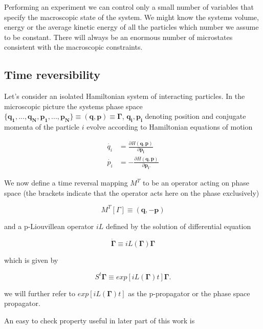 \documentclass[a4paper,12pt,nofootinbib]{article}
\begin{document}
Performing an experiment we can control only a small number of variables that specify the macroscopic state of the system. We might know the systems volume, energy or the average kinetic energy of all the particles which number we assume to be constant. There will always be an enormous number of microstates consistent with the macroscopic constraints.

\subsection{Time reversibility}
Let's consider an isolated Hamiltonian system of interacting particles.
In the microscopic picture the systems phase space $\{\bm{q_1},...,\bm{q_N},\bm{p_1},...,\bm{p_N} \} \equiv (\bm{q},\bm{p})\equiv \bm{\Gamma} $, $\bm{q_i}, \bm{p_i} $ denoting position and conjugate momenta of the particle $i$ evolve according to Hamiltonian equations of motion

\begin{equation}
\begin{aligned}
  \dot{q_i} &=\frac{\partial H(\bm{q},\bm{p})}{\partial{\bm{p_i}}} \\
  \dot{p_i} &=- \frac{\partial H(\bm{q},\bm{p})}{\partial{\bm{p_i}}.}
\end{aligned}
\end{equation}

We now define a time reversal mapping $M^T$ to be an operator acting on phase space (the brackets indicate that the operator acts here on the phase exclusively) 

\begin{equation}
  M^T[ \Gamma] \equiv (\bm{q},-\bm{p})
\end{equation}

and a p-Liouvillean operator $iL$ defined by the solution of differential equation 

\begin{equation}
 \dot{\bm{\Gamma}} \equiv iL(\bm{\Gamma})\bm{\Gamma}
\end{equation}

which is given by

\begin{equation}
  S^t \bm{\Gamma} \equiv exp[iL(\bm{\Gamma})t]\bm{\Gamma}.
\end{equation}


we will further refer to $ exp[iL(\bm{\Gamma})t] $ as the p-propagator or the phase space propagator.


An easy to check property useful in later part of this work is
\end{document}
